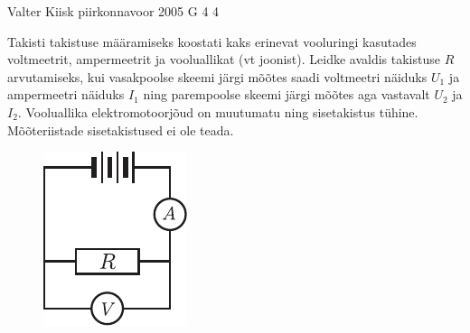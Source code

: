 {Valter Kiisk} %
{piirkonnavoor} %
{2005} %
{G 4} %
{4} %
{
\ifStatement
Takisti takistuse määramiseks koostati kaks erinevat vooluringi kasutades voltmeetrit, ampermeetrit ja vooluallikat (vt joonist). Leidke avaldis takistuse $R$ arvutamiseks, kui vasakpoolse skeemi järgi mõõtes saadi voltmeetri näiduks $U_1$ ja ampermeetri näiduks $I_1$ ning parempoolse skeemi järgi mõõtes aga vastavalt $U_2$ ja $I_2$. Vooluallika elektromotoorjõud on muutumatu ning sisetakistus tühine. Mõõteriistade sisetakistused ei ole teada.

\begin{figure}[h]
	\centering
	\begin{minipage}[b]{0.25\textwidth}
		\includegraphics[width=\linewidth]{2005-v2g-04-yl1}
	\end{minipage}
	\hspace{30pt}
	\begin{minipage}[b]{0.3\textwidth}

\end{minipage}
\end{figure}}
